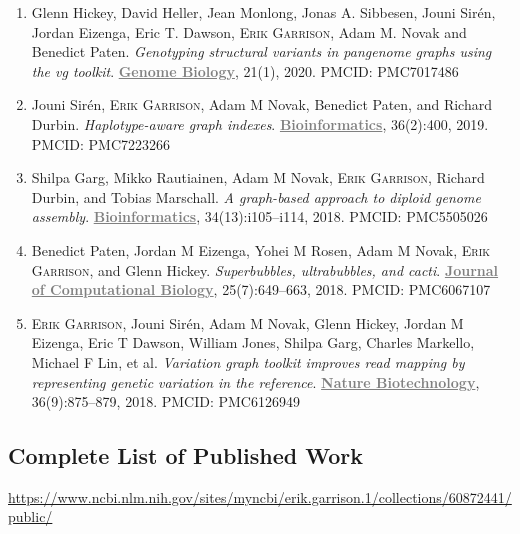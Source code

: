 \documentclass{nihbiosketch}
\newcommand{\hijournal}[1]{{\bf \textcolor{gray}{\uline{#1}}}}
\begin{document}
\begin{enumerate}
\begin{enumerate}
  \item Glenn Hickey, David Heller, Jean Monlong, Jonas A. Sibbesen, Jouni Sirén, Jordan Eizenga, Eric T. Dawson, \textsc{Erik Garrison}, Adam M. Novak and Benedict Paten. \emph{Genotyping structural variants in pangenome graphs using the vg toolkit}. \hijournal{Genome Biology}, 21(1), 2020. PMCID: PMC7017486

  \item Jouni Sirén, \textsc{Erik Garrison}, Adam M Novak, Benedict Paten, and Richard Durbin. \emph{Haplotype-aware graph indexes}. \hijournal{Bioinformatics}, 36(2):400, 2019. PMCID: PMC7223266

  \item Shilpa Garg, Mikko Rautiainen, Adam M Novak, \textsc{Erik Garrison}, Richard Durbin, and Tobias Marschall. \emph{A graph-based approach to diploid genome assembly}. \hijournal{Bioinformatics}, 34(13):i105–i114, 2018. PMCID: PMC5505026

  \item Benedict Paten, Jordan M Eizenga, Yohei M Rosen, Adam M Novak, \textsc{Erik Garrison}, and Glenn Hickey. \emph{Superbubbles, ultrabubbles, and cacti}. \hijournal{Journal of Computational Biology}, 25(7):649–663, 2018. PMCID: PMC6067107

  \item \textsc{Erik Garrison}, Jouni Sirén, Adam M Novak, Glenn Hickey, Jordan M Eizenga, Eric T Dawson, William Jones, Shilpa Garg, Charles Markello, Michael F Lin, et al. \emph{Variation graph toolkit improves read mapping by representing genetic variation in the reference}. \hijournal{Nature Biotechnology}, 36(9):875–879, 2018. PMCID: PMC6126949

  \end{enumerate}

\end{enumerate}

\subsection*{Complete List of Published Work}

\begin{datetbl}
  \url{https://www.ncbi.nlm.nih.gov/sites/myncbi/erik.garrison.1/collections/60872441/public/}
\end{datetbl}


\end{document}
